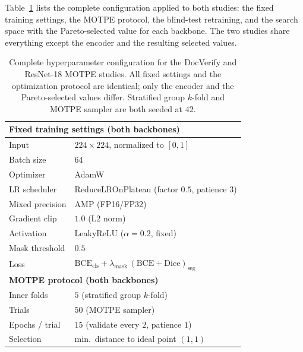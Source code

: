 \documentclass[11pt]{article}
\begin{document}
Table~\ref{tab:hpo_full} lists the complete configuration applied to both
studies: the fixed training settings, the MOTPE protocol, the blind-test
retraining, and the search space with the Pareto-selected value for each
backbone. The two studies share everything except the encoder and the resulting
selected values.

\begin{table}[h]
  \centering
  \caption{Complete hyperparameter configuration for the DocVerify and ResNet-18
           MOTPE studies. All fixed settings and the optimization protocol are
           identical; only the encoder and the Pareto-selected values differ.
           Stratified group $k$-fold and MOTPE sampler are both seeded at $42$.}
  \label{tab:hpo_full}
  \small
  \begin{tabular}{lll}
    \toprule
    \multicolumn{3}{l}{\textbf{Fixed training settings (both backbones)}} \\
    \midrule
    Input            & \multicolumn{2}{l}{$224\times224$, normalized to $[0,1]$} \\
    Batch size       & \multicolumn{2}{l}{$64$} \\
    Optimizer        & \multicolumn{2}{l}{AdamW} \\
    LR scheduler     & \multicolumn{2}{l}{ReduceLROnPlateau (factor $0.5$, patience $3$)} \\
    Mixed precision  & \multicolumn{2}{l}{AMP (FP16/FP32)} \\
    Gradient clip    & \multicolumn{2}{l}{$1.0$ (L2 norm)} \\
    Activation       & \multicolumn{2}{l}{LeakyReLU ($\alpha=0.2$, fixed)} \\
    Mask threshold   & \multicolumn{2}{l}{$0.5$} \\
    Loss             & \multicolumn{2}{l}{$\mathrm{BCE}_{\mathrm{cls}} + \lambda_{\text{mask}}\,(\mathrm{BCE}+\mathrm{Dice})_{\mathrm{seg}}$} \\
    \midrule
    \multicolumn{3}{l}{\textbf{MOTPE protocol (both backbones)}} \\
    \midrule
    Inner folds      & \multicolumn{2}{l}{$5$ (stratified group $k$-fold)} \\
    Trials           & \multicolumn{2}{l}{$50$ (MOTPE sampler)} \\
    Epochs / trial   & \multicolumn{2}{l}{$15$ (validate every $2$, patience $1$)} \\
    Selection        & \multicolumn{2}{l}{min.\ distance to ideal point $(1,1)$} \\

\end{tabular}
\end{table}
\end{document}
